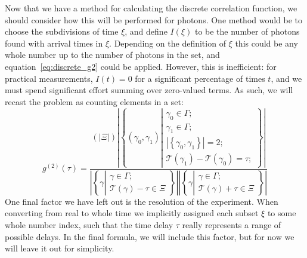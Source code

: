 \documentclass{article}
\newcommand{\braces}[1]{\ensuremath{\left\lbrace #1 \right\rbrace}}
\newcommand{\parens}[1]{\ensuremath{\left( #1 \right)}}
\newcommand{\setbuilder}[2]{\ensuremath{\braces{#1 \left| #2 \right.}}}
\newcommand{\gn}[1]{\ensuremath{g^{(#1)}}}
\newcommand{\abs}[1]{\ensuremath{\left|#1\right|}}
\newcommand{\Time}{\ensuremath{\mathcal{T}}}
\newcommand{\photon}{\ensuremath{\gamma}}
\newcommand{\photons}{\ensuremath{\Gamma}}
\newcommand{\integrationtime}{\ensuremath{\Xi}}
\newcommand{\timewindow}{\ensuremath{\xi}}
\begin{document}
Now that we have a method for calculating the discrete correlation function, we should consider how this will be performed for photons. One method would be to choose the subdivisions of time $\timewindow$, and define $I(\timewindow)$ to be the number of photons found with arrival times in $\timewindow$. Depending on the definition of $\timewindow$ this could be any whole number up to the number of photons in the set, and equation~\ref{eq:discrete_g2} could be applied. However, this is inefficient: for practical measurements, $I(t)=0$ for a significant percentage of times $t$, and we must spend significant effort summing over zero-valued terms. As such, we will recast the problem as counting elements in a set:
\begin{equation}
\label{eq:photon_g2}
\gn{2}(\tau) = \frac{\parens{\abs{\integrationtime}}
                     \abs{\setbuilder{(\photon_{0},\photon_{1})}
                                     {\begin{aligned}
                                      \photon_{0}\in\photons;\\
                                      \photon_{1}\in\photons;\\
                                      \abs{\braces{\photon_{0},\photon_{1}}}=2;\\
                                      \Time(\photon_{1})-\Time(\photon_{0})=\tau;
                                      \end{aligned}}}}
                    {
                             \abs{\setbuilder{\photon}{\begin{aligned}
                                                      \photon\in\photons;\\
                                                      \Time(\photon)-\tau\in\integrationtime
                                                      \end{aligned}}}
                             \abs{\setbuilder{\photon}{\begin{aligned}
                                                      \photon\in\photons;\\
                                                      \Time(\photon)+\tau\in\integrationtime
                                                      \end{aligned}}}}
\end{equation} 
One final factor we have left out is the resolution of the experiment. When converting from real to whole time we implicitly assigned each subset $\timewindow$ to some whole number index, such that the time delay $\tau$ really represents a range of possible delays. In the final formula, we will include this factor, but for now we will leave it out for simplicity.
\end{document}

